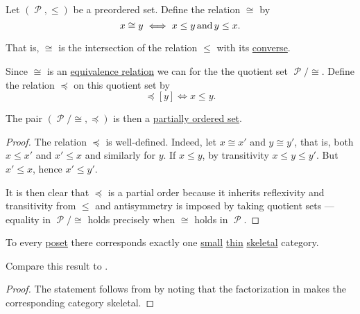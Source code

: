 \begin{proposition}\label{thm:preorder_to_partial_order}
  Let \( (\mscrP, \leq) \) be a preordered set. Define the relation \( \cong \) by
  \begin{equation}\label{eq:thm:preorder_to_partial_order/equivalence}
    x \cong y \iff x \leq y \T{and} y \leq x.
  \end{equation}

  That is, \( \cong \) is the intersection of the relation \( \leq \) with its \hyperref[def:binary_relation/converse]{converse}.

  Since \( \cong \) is an \hyperref[def:equivalence_relation]{equivalence relation} we can for the the quotient set \( \mscrP / \cong \). Define the relation \( \preceq \) on this quotient set by
  \begin{equation*}
    [x] \preceq [y] \iff x \leq y.
  \end{equation*}

  The pair \( (\mscrP / \cong, \preceq) \) is then a \hyperref[def:poset]{partially ordered set}.
\end{proposition}
\begin{proof}
  The relation \( \preceq \) is well-defined. Indeed, let \( x \cong x' \) and \( y \cong y' \), that is, both \( x \leq x' \) and \( x' \leq x \) and similarly for \( y \). If \( x \leq y \), by transitivity \( x \leq y \leq y' \). But \( x' \leq x \), hence \( x' \leq y' \).

  It is then clear that \( \preceq \) is a partial order because it inherits reflexivity and transitivity from \( \leq \) and antisymmetry is imposed by taking quotient sets --- equality in \( \mscrP / \cong \) holds precisely when \( \cong \) holds in \( \mscrP \).
\end{proof}

\begin{proposition}\label{thm:partial_order_category_correspondence}
  To every \hyperref[def:poset]{poset} there corresponds exactly one \hyperref[def:category_cardinality]{small} \hyperref[def:thin_category]{thin} \hyperref[def:skeletal_category]{skeletal} category.

  Compare this result to .
\end{proposition}
\begin{proof}
  The statement follows from  by noting that the factorization in  makes the corresponding category skeletal.
\end{proof}


